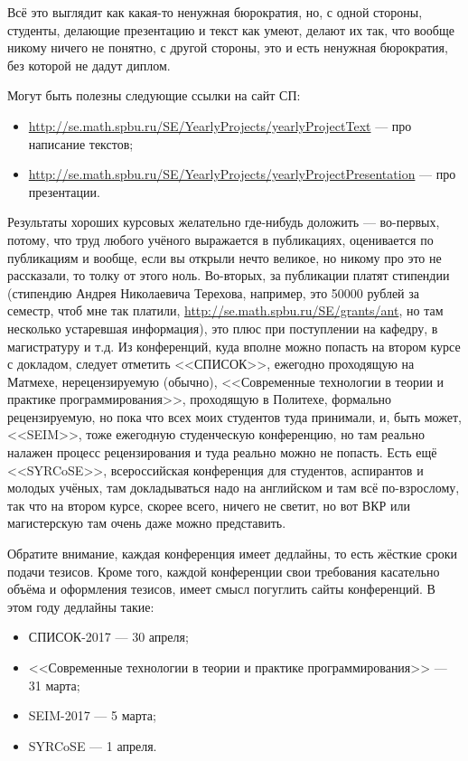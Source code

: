 \documentclass[a5paper]{article}
\begin{document}
Всё это выглядит как какая-то ненужная бюрократия, но, с одной стороны, студенты, делающие презентацию и текст как умеют, делают их так, что вообще никому ничего не понятно, с другой стороны, это и есть ненужная бюрократия, без которой не дадут диплом.

Могут быть полезны следующие ссылки на сайт СП: 
\begin{itemize}
	\item \url{http://se.math.spbu.ru/SE/YearlyProjects/yearlyProjectText} --- про написание текстов;
	\item \url{http://se.math.spbu.ru/SE/YearlyProjects/yearlyProjectPresentation} --- про презентации.
\end{itemize}

Результаты хороших курсовых желательно где-нибудь доложить --- во-первых, потому, что труд любого учёного выражается в публикациях, оценивается по публикациям и вообще, если вы открыли нечто великое, но никому про это не рассказали, то толку от этого ноль. Во-вторых, за публикации платят стипендии (стипендию Андрея Николаевича Терехова, например, это 50000 рублей за семестр, чтоб мне так платили, \url{http://se.math.spbu.ru/SE/grants/ant}, но там несколько устаревшая информация), это плюс при поступлении на кафедру, в магистратуру и т.д. Из конференций, куда вполне можно попасть на втором курсе с докладом, следует отметить <<СПИСОК>>, ежегодно проходящую на Матмехе, нерецензируемую (обычно), <<Современные технологии в теории и практике программирования>>, проходящую в Политехе, формально рецензируемую, но пока что всех моих студентов туда принимали, и, быть может, <<SEIM>>, тоже ежегодную студенческую конференцию, но там реально налажен процесс рецензирования и туда реально можно не попасть. Есть ещё <<SYRCoSE>>, всероссийская конференция для студентов, аспирантов и молодых учёных, там докладываться надо на английском и там всё по-взрослому, так что на втором курсе, скорее всего, ничего не светит, но вот ВКР или магистерскую там очень даже можно представить. 

Обратите внимание, каждая конференция имеет дедлайны, то есть жёсткие сроки подачи тезисов. Кроме того,  каждой конференции свои требования касательно объёма и оформления тезисов, имеет смысл погуглить сайты конференций. В этом году дедлайны такие:
\begin{itemize}
	\item СПИСОК-2017 --- 30 апреля;
	\item <<Современные технологии в теории и практике программирования>> --- 31 марта;
	\item SEIM-2017 --- 5 марта;
	\item SYRCoSE --- 1 апреля.
\end{itemize}
\end{document}
